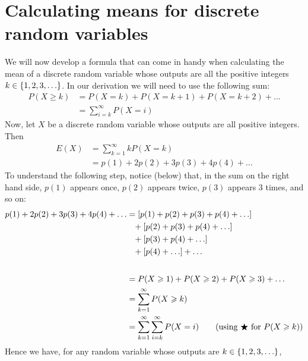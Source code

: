 \section{Calculating means for discrete random variables}
We will now develop a formula that can come in handy when calculating the mean of a discrete random variable whose outputs are all the positive integers $k \in \left\{1,2,3,\ldots\right\}$. In our derivation we will need to use the following sum:
\begin{align*}
P(X \geq k) & = P(X = k) + P(X = k+1) + P(X = k+2) + \ldots \\\
		  & = \sum_{i=k}^\infty P(X = i) \tag{$\bigstar$}
\end{align*}
Now, let $X$ be a discrete random variable whose outputs are all positive integers. Then
\begin{align*}
E(X)  & = \sum_{k=1}^\infty kP(X = k)  \tag{definition of $E(X)$} \\
	& = p(1) + 2p(2) + 3p(3) + 4p(4) + \ldots
\end{align*}
To understand the following step, notice (below) that, in the sum on the right hand side, $p(1)$ appears once, $p(2)$ appears twice, $p(3)$ appears 3 times, and so on:  
\begin{align*}
p(1) + 2p(2) + 3p(3) + 4p(4) + \ldots & = \squac{p(1) + p(2) + p(3) + p(4) + \ldots} \\
	& \phantom{=} + \squac{p(2) + p(3) + p(4) + \ldots} \\
	& \phantom{=} + \squac{p(3) + p(4) + \ldots}  \\
	& \phantom{=} + \squac{p(4) + \ldots} + \ldots \ssk \\
	& = P(X \geq 1) + P(X \geq 2) + P(X \geq 3) + \ldots \\
	& = \sum_{k=1}^\infty P(X \geq k) \\
	& = \sum_{k=1}^\infty \sum_{i=k}^\infty P(X = i) \tag{using $\bigstar$ for $P(X \geq k)$}
\end{align*}
Hence we have, for any random variable whose outputs are $k \in \left\{1,2,3,\ldots\right\}$,

  	\bigskip
	
	\hfil{}
	\bigskip
	\bigskip

